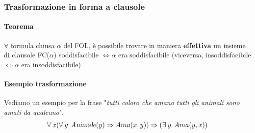 \documentclass[10pt]{book}
\begin{document}
\subsubsection{Trasformazione in forma a clausole}
\paragraph{Teorema} $\forall$ formula chiusa $\alpha$ del FOL, è possibile trovare in maniera \textbf{effettiva} un insieme di clausole FC($\alpha$) soddisfacibile $\Leftrightarrow \alpha$ era soddisfacibile (viceversa, insoddisfacibile $\Leftrightarrow \alpha$ era insoddisfacibile)
\paragraph{Esempio trasformazione} Vediamo un esempio per la frase "\textit{tutti coloro che amano tutti gli animali sono amati da qualcuno}".
$$\forall\: x (\forall\: y\:\:\textsl{Animale}(y) \Rightarrow Ama(x, y)) \Rightarrow (\exists\: y\:\:Ama(y, x))$$
\end{document}
